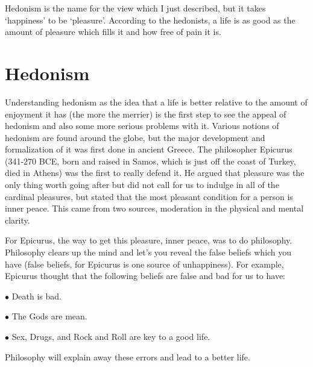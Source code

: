 Hedonism is the name for the view which I just described, but it takes ‘happiness’ to be ‘pleasure’. According to the hedonists, a life is as good as the amount of pleasure which fills it and how free of pain it is. 

\section{Hedonism}

Understanding hedonism as the idea that a life is better relative to the amount of enjoyment it has (the more the merrier) is the first step to see the appeal of hedonism and also some more serious problems with it. Various notions of hedonism are found around the globe, but the major development and formalization of it was first done in ancient Greece. The philosopher Epicurus (341-270 BCE, born and raised in Samos, which is just off the coast of Turkey, died in Athens) was the first to really defend it. He argued that pleasure was the only thing worth going after but did not call for us to indulge in all of the cardinal pleasures, but stated that the most pleasant condition for a person is inner peace. This came from two sources, moderation in the physical and mental clarity.

For Epicurus, the way to get this pleasure, inner peace, was to do philosophy. Philosophy clears up the mind and let’s you reveal the false beliefs which you have (false beliefs, for Epicurus is one source of unhappiness). For example, Epicurus thought that the following beliefs are false and bad for us to have:
\begin{earg}
    \item[$\bullet$] Death is bad.
    \item[$\bullet$] The Gods are mean.
    \item[$\bullet$] Sex, Drugs, and Rock and Roll are key to a good life.
\end{earg}

Philosophy will explain away these errors and lead to a better life.

